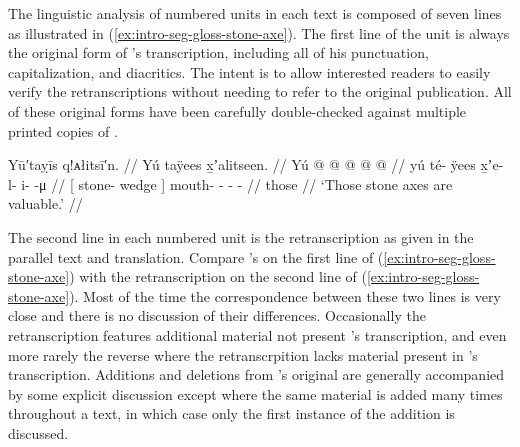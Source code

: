 The linguistic analysis of numbered units in each text is composed of seven lines as illustrated in (\ref{ex:intro-seg-gloss-stone-axe}).
The first line of the unit is always the original form of \citeauthor{swanton:1909}’s transcription, including all of his punctuation, capitalization, and diacritics.
The intent is to allow interested readers to easily verify the retranscriptions without needing to refer to the original publication.
All of these original forms have been carefully double-checked against multiple printed copies of \cite{swanton:1909}.

\ex\label{ex:intro-seg-gloss-stone-axe}%
%
\begingl
	\glpreamble{}%
		Yū′taỵīs q!ᴀłitsī′n. //
	\glpreamble{}%
		Yú taÿees x̱ʼalitseen. //
	\gla{}%
		{} Yú  @ {} {}  @ {} @ {} @ {} @ {} //
	\glb{}%
		{} yú té- ÿees {} x̱ʼe- l- i-  -μ //
	\glc{}%
		{}[  stone- wedge {}] mouth- - -  - //
	\gld{}%
		{} those  {} {}  {} {} {} {} //
	\glft{}%
		‘Those stone axes are valuable.’
		//
\endgl
\xe

The second line in each numbered unit is the retranscription as given in the parallel text and translation.
Compare \citeauthor{swanton:1909}’s  on the first line of (\ref{ex:intro-seg-gloss-stone-axe}) with the retranscription  on the second line of (\ref{ex:intro-seg-gloss-stone-axe}).
Most of the time the correspondence between these two lines is very close and there is no discussion of their differences.
Occasionally the retranscription features additional material not present \citeauthor{swanton:1909}’s transcription, and even more rarely the reverse where the retranscrpition lacks material present in \citeauthor{swanton:1909}’s transcription.
Additions and deletions from \citeauthor{swanton:1909}’s original are generally accompanied by some explicit discussion except where the same material is added many times throughout a text, in which case only the first instance of the addition is discussed.

